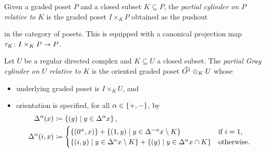 
\begin{dfn}
    Given a graded poset \( P \) and a closed subset \( K \subseteq P \), the \emph{partial cylinder on \( P \) relative to \( K \)} is the graded poset \( I \times_K P \) obtained as the pushout
    \begin{center}
    \end{center}
    in the category of posets.
    This is equipped with a canonical projection map \( \tau_K \colon I \times_K P \twoheadrightarrow P \).
\end{dfn}

\begin{dfn}
	Let \( U \) be a regular directed complex and \( K \subseteq U \) a closed subset.
	The \emph{partial Gray cylinder on \( U \) relative to \( K \)} is the oriented graded poset \( \vec{O}^{1} \otimes_K U \) whose
    \begin{itemize}
        \item underlying graded poset is \( I \times_K U \), and
        \item orientation is specified, for all \( \alpha \in \left\{ {+, -} \right\} \), by
        \begin{align*}
            \Delta_{}^{\alpha}(x) & \coloneqq \left\{ {(y) \mid y \in \Delta_{}^{\alpha}x} \right\}, \\
            \Delta_{}^{\alpha}(i, x) & \coloneqq \begin{cases}
                \left\{ {(0^\alpha, x)} \right\} + \left\{ {(1, y) \mid y \in \Delta_{}^{-\alpha}x \setminus K} \right\} &
                \text{if \( i = 1 \),} \\
                \left\{ {(i, y) \mid y \in \Delta_{}^{\alpha}x \setminus K} \right\} + 
                \left\{ {(y) \mid y \in \Delta_{}^{\alpha}x \cap K} \right\} &
                \text{otherwise}.
            \end{cases}
        \end{align*}
    \end{itemize}
\end{dfn}

